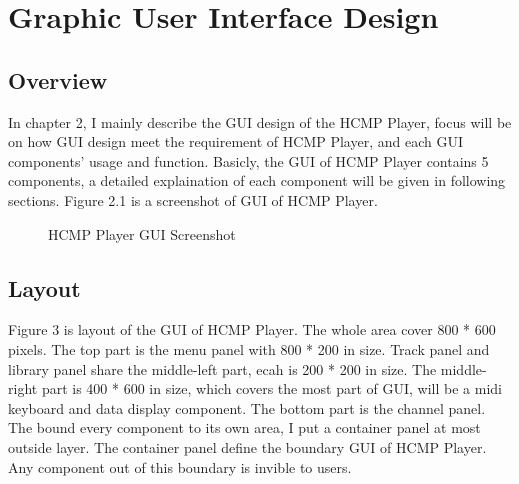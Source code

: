 
\chapter{Graphic User Interface Design} %

\section{Overview}
In chapter 2, I mainly describe the GUI design of the HCMP Player, focus will 
be on how GUI design meet the requirement of HCMP Player, and each GUI components' 
usage and function. Basicly, the GUI of HCMP Player contains 5 components, 
a detailed explaination of each component will be given in following sections. 
Figure 2.1 is a screenshot of GUI of HCMP Player. 

\begin{figure}[H]
\caption{HCMP Player GUI Screenshot}
\label{fig:speciation}
\end{figure}

\section{Layout}
Figure 3 is layout of the GUI of HCMP Player. The whole area 
cover 800 * 600 pixels. The top part is the menu panel with 800 * 200 in size. 
Track panel and 
library panel share the middle-left part, ecah is 200 * 200 in size. 
The middle-right part is 400 * 600 in size, which covers the most part of GUI, will be   
a midi keyboard and data display component. The bottom part is the channel   
panel. The bound every component to its own area, I put a container panel at most 
outside layer. The container panel define the boundary GUI of HCMP Player. Any 
component out of this boundary is invible to users. 


